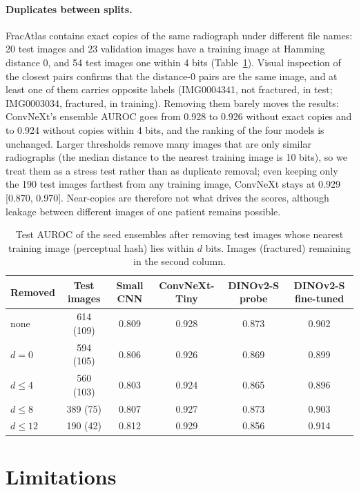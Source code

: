 \documentclass[11pt,a4paper]{article}
\begin{document}
\paragraph{Duplicates between splits.} FracAtlas contains exact copies of the same radiograph under different file
names: 20 test images and 23 validation images have a training image at Hamming distance 0, and 54 test images one
within 4 bits (Table~\ref{tab:dup}). Visual inspection of the closest pairs confirms that the distance-0 pairs are
the same image, and at least one of them carries opposite labels (IMG0004341, not fractured, in test; IMG0003034,
fractured, in training). Removing them barely moves the results: ConvNeXt's ensemble AUROC goes from 0.928 to 0.926
without exact copies and to 0.924 without copies within 4 bits, and the ranking of the four models is unchanged.
Larger thresholds remove many images that are only similar radiographs (the median distance to the nearest training
image is 10 bits), so we treat them as a stress test rather than as duplicate removal; even keeping only the 190 test
images farthest from any training image, ConvNeXt stays at 0.929 [0.870, 0.970]. Near-copies are therefore not what
drives the scores, although leakage between different images of one patient remains possible.

\begin{table}[t]
\centering
\caption{Test AUROC of the seed ensembles after removing test images whose nearest training image (perceptual hash)
lies within $d$ bits. Images (fractured) remaining in the second column.}
\label{tab:dup}
\small
\setlength{\tabcolsep}{4pt}
\begin{tabular}{lccccc}
\toprule
Removed & Test images & Small CNN & ConvNeXt-Tiny & DINOv2-S probe & DINOv2-S fine-tuned \\
\midrule
none            & 614 (109) & 0.809 & 0.928 & 0.873 & 0.902 \\
$d = 0$         & 594 (105) & 0.806 & 0.926 & 0.869 & 0.899 \\
$d \le 4$       & 560 (103) & 0.803 & 0.924 & 0.865 & 0.896 \\
$d \le 8$       & 389 (75)  & 0.807 & 0.927 & 0.873 & 0.903 \\
$d \le 12$      & 190 (42)  & 0.812 & 0.929 & 0.856 & 0.914 \\
\bottomrule
\end{tabular}
\end{table}

\section{Limitations}
\end{document}

